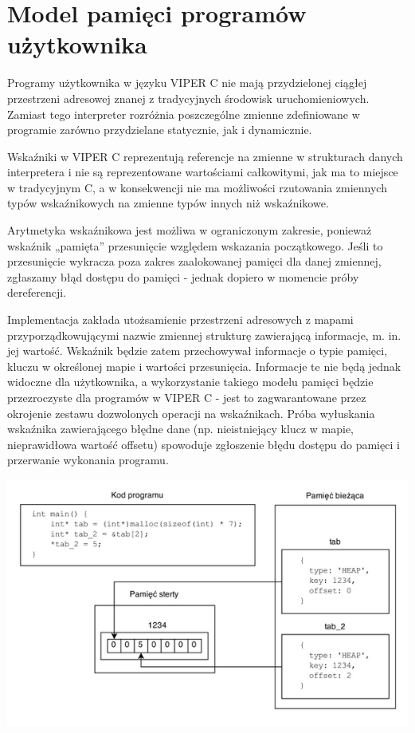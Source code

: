 \documentclass[a4paper,twoside,openright,11pt]{report}
\begin{document}
  \section {Model pamięci programów użytkownika}
  \par Programy użytkownika w języku VIPER C nie mają przydzielonej ciągłej przestrzeni adresowej znanej z tradycyjnych środowisk uruchomieniowych. Zamiast tego interpreter rozróżnia poszczególne zmienne zdefiniowane w programie zarówno przydzielane statycznie, jak i dynamicznie. 
  \par Wskaźniki w VIPER C reprezentują referencje na zmienne w strukturach danych interpretera i nie są reprezentowane wartościami całkowitymi, jak ma to miejsce w tradycyjnym C, a w konsekwencji nie ma możliwości rzutowania zmiennych typów wskaźnikowych na zmienne typów innych niż wskaźnikowe. 
  \par Arytmetyka wskaźnikowa jest możliwa w ograniczonym zakresie, ponieważ wskaźnik „pamięta” przesunięcie względem wskazania początkowego. Jeśli to przesunięcie wykracza poza zakres zaalokowanej pamięci dla danej zmiennej, zgłaszamy błąd dostępu do pamięci - jednak dopiero w momencie próby dereferencji. 
  \par Implementacja zakłada utożsamienie przestrzeni adresowych z mapami przyporządkowującymi nazwie zmiennej strukturę zawierającą informacje, m. in. jej wartość. Wskaźnik będzie zatem przechowywał informacje o typie pamięci, kluczu w określonej mapie i wartości przesunięcia. Informacje te nie będą jednak widoczne dla użytkownika, a wykorzystanie takiego modelu pamięci będzie przezroczyste dla programów w VIPER C - jest to zagwarantowane przez okrojenie zestawu dozwolonych operacji na wskaźnikach. Próba wyłuskania wskaźnika zawierającego błędne dane (np. nieistniejący klucz w mapie, nieprawidłowa wartość offsetu) spowoduje zgłoszenie błędu dostępu do pamięci i przerwanie wykonania programu.

\begin{center}
  \includegraphics[width=\textwidth]{pam}
\end{center}
\end{document}
